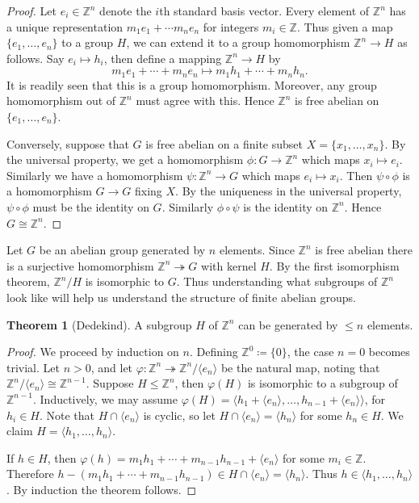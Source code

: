 \documentclass[12pt,a4paper]{article}
\newcommand{\Z}{\mathbb{Z}}
\theoremstyle{definition}
\newtheorem{theorem}{Theorem}[section]
\begin{document}
\begin{proof}
  Let $e_i\in\Z^n$ denote the $i$th standard basis vector. Every element of $\Z^n$ has a unique representation $m_1e_1+\cdots m_ne_n$ for integers $m_i\in\Z$. Thus given a map $\{e_1,\ldots,e_n\}$ to a group $H$, we can extend it to a group homomorphism $\Z^n\to H$ as follows. Say $e_i\mapsto h_i$, then define a mapping $\Z^n\to H$ by
  \[ m_1e_1 + \cdots + m_ne_n \mapsto m_1h_1 + \cdots + m_nh_n. \]
  It is readily seen that this is a group homomorphism. Moreover, any group homomorphism out of $\Z^n$ must agree with this. Hence $\Z^n$ is free abelian on $\{e_1,\ldots,e_n\}$.

  Conversely, suppose that $G$ is free abelian on a finite subset $X=\{x_1,\ldots,x_n\}$. By the universal property, we get a homomorphism $\phi\colon G\to\Z^n$ which maps $x_i\mapsto e_i$. Similarly we have a homomorphism $\psi\colon\Z^n\to G$ which maps $e_i\mapsto x_i$. Then $\psi\circ\phi$ is a homomorphism $G\to G$ fixing $X$. By the uniqueness in the universal property, $\psi\circ\phi$ must be the identity on $G$. Similarly $\phi\circ\psi$ is the identity on $\Z^n$. Hence $G\cong\Z^n$.
\end{proof}

Let $G$ be an abelian group generated by $n$ elements. Since $\Z^n$ is free abelian there is a surjective homomorphism $\Z^n\twoheadrightarrow G$ with kernel $H$. By the first isomorphism theorem, $\Z^n/H$ is isomorphic to $G$. Thus understanding what subgroups of $\Z^n$ look like will help us understand the structure of finite abelian groups.

\begin{theorem}[Dedekind]
  A subgroup $H$ of $\Z^n$ can be generated by $\leq n$ elements.
\end{theorem}

\begin{proof}
  We proceed by induction on $n$. Defining $\Z^0\coloneqq\{0\}$, the case $n=0$ becomes trivial. Let $n>0$, and let $\varphi\colon\Z^n\twoheadrightarrow\Z^n/\langle e_n \rangle$ be the natural map, noting that $\Z^n/\langle e_n \rangle\cong\Z^{n-1}$. Suppose $H\leq\Z^n$, then $\varphi(H)$ is isomorphic to a subgroup of $\Z^{n-1}$. Inductively, we may assume $\varphi(H)=\langle h_1 + \langle e_n \rangle, \ldots, h_{n-1} + \langle e_n \rangle \rangle$, for $h_i\in H$. Note that $H\cap\langle e_n \rangle$ is cyclic, so let $H\cap\langle e_n \rangle=\langle h_n \rangle$ for some $h_n\in H$. We claim $H=\langle h_1,\ldots,h_n \rangle$.

  If $h\in H$, then $\varphi(h)=m_1h_1+\cdots+ m_{n-1}h_{n-1}+\langle e_n \rangle$ for some $m_i\in\Z$. Therefore $h-(m_1h_1+\cdots+m_{n-1}h_{n-1})\in H\cap\langle e_n \rangle=\langle h_n \rangle$. Thus $h\in\langle h_1,\ldots,h_n \rangle$. By induction the theorem follows.
\end{proof}
\end{document}
